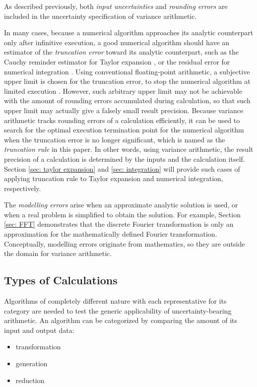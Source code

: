 \documentclass[twoside]{article}
\numberwithin{equation}{section}
\begin{document}
As described previously, both \emph{input uncertainties} and \emph{rounding errors} are included in the uncertainty specification of variance arithmetic.

In many cases, because a numerical algorithm approaches its analytic counterpart only after infinitive execution, a good numerical algorithm should have an estimator of the \emph{truncation error} toward its analytic counterpart, such as the Cauchy reminder estimator for Taylor expansion \cite{Numerical_Recipes}, or the residual error for numerical integration \cite{Numerical_Recipes}.  
Using conventional floating-point arithmetic, a subjective upper limit is chosen for the truncation error, to stop the numerical algorithm at limited execution \cite{Numerical_Recipes}. 
However, such arbitrary upper limit may not be achievable with the amount of rounding errors accumulated during calculation, so that such upper limit may actually give a falsely small result precision. 
Because variance arithmetic tracks rounding errors of a calculation efficiently, it can be used to search for the optimal execution termination point for the numerical algorithm when the truncation error is no longer significant, which is named as the \emph{truncation rule} in this paper. In other words, using variance arithmetic, the result precision of a calculation is determined by the inputs and the calculation itself.  
Section \ref{sec: taylor expansion} and \ref{sec: integration} will provide such cases of applying truncation rule to Taylor expansion and numerical integration, respectively.

The \emph{modelling errors} arise when an approximate analytic solution is used, or when a real problem is simplified to obtain the solution.  
For example, Section \ref{sec: FFT} demonstrates that the discrete Fourier transformation is only an approximation for the mathematically defined Fourier transformation.  
Conceptually, modelling errors originate from mathematics, so they are outside the domain for variance arithmetic.


\subsection{Types of Calculations}

Algorithms of completely different nature with each representative for its category are needed to test the generic applicability of uncertainty-bearing arithmetic.  
An algorithm can be categorized by comparing the amount of its input and output data:
\begin{itemize}
\item transformation
\item generation
\item reduction
\end{itemize}
\end{document}
